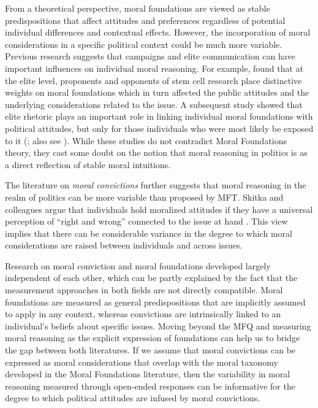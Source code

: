 \documentclass[12pt]{article}
\begin{document}
From a theoretical perspective, moral foundations are viewed as stable predispositions that affect attitudes and preferences regardless of potential individual differences and contextual effects. However, the incorporation of moral considerations in a specific political context could be much more variable. Previous research suggests that campaigns and elite communication can have important influences on individual moral reasoning. For example, \citet{clifford2013words} found that at the elite level, proponents and opponents of stem cell research place distinctive weights on moral foundations which in turn affected the public attitudes and the underlying considerations related to the issue. A subsequent study showed that elite rhetoric plays an important role in linking individual moral foundations with political attitudes, but only for those individuals who were most likely be exposed to it (\citealt{clifford2015concerns}; also see \citealt{day2014shifting}). While these studies do not contradict Moral Foundations theory, they cast some doubt on the notion that moral reasoning in politics is as a direct reflection of stable moral intuitions. 

The literature on \textit{moral convictions} further suggests that moral reasoning in the realm of politics can be more variable than proposed by MFT. Skitka and colleagues argue that individuals hold moralized attitudes if they have a universal perception of ``right and wrong'' connected to the issue at hand \citep{skitka2005moral,mullen2006exploring,skitka2010psychology}. This view implies that there can be considerable variance in the degree to which moral considerations are raised between individuals and across issues.

Research on moral conviction and moral foundations developed largely independent of each other, which can be partly explained by the fact that the measurement approaches in both fields are not directly compatible. Moral foundations are measured as general predispositions that are implicitly assumed to apply in any context, whereas convictions are intrinsically linked to an individual's beliefs about specific issues. Moving beyond the MFQ and measuring moral reasoning as the explicit expression of foundations can help us to bridge the gap between both literatures. If we assume that moral convictions can be expressed as moral considerations that overlap with the moral taxonomy developed in the Moral Foundations literature, then the variability in moral reasoning measured through open-ended responses can be informative for the degree to which political attitudes are infused by moral convictions.
\end{document}
